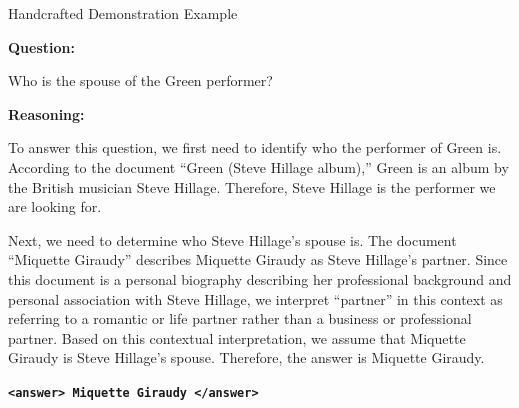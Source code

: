 \begin{frame}{Handcrafted Demonstration Example}

\scriptsize

\textbf{Question:}

Who is the spouse of the Green performer?

\vspace{0.15cm}

\textbf{Reasoning:}

To answer this question, we first need to identify who the performer
of Green is. According to the document ``Green (Steve Hillage album),''
Green is an album by the British musician Steve Hillage. Therefore,
Steve Hillage is the performer we are looking for.

\vspace{0.1cm}

Next, we need to determine who Steve Hillage's spouse is. The document
``Miquette Giraudy'' describes Miquette Giraudy as Steve Hillage's
partner. Since this document is a personal biography describing her
professional background and personal association with Steve Hillage,
we interpret ``partner'' in this context as referring to a romantic
or life partner rather than a business or professional partner.
Based on this contextual interpretation, we assume that Miquette
Giraudy is Steve Hillage's spouse. Therefore, the answer is
Miquette Giraudy.

\vspace{0.1cm}

\begin{center}
    \textbf{\texttt{<answer> Miquette Giraudy </answer>}}
\end{center}

\end{frame}


